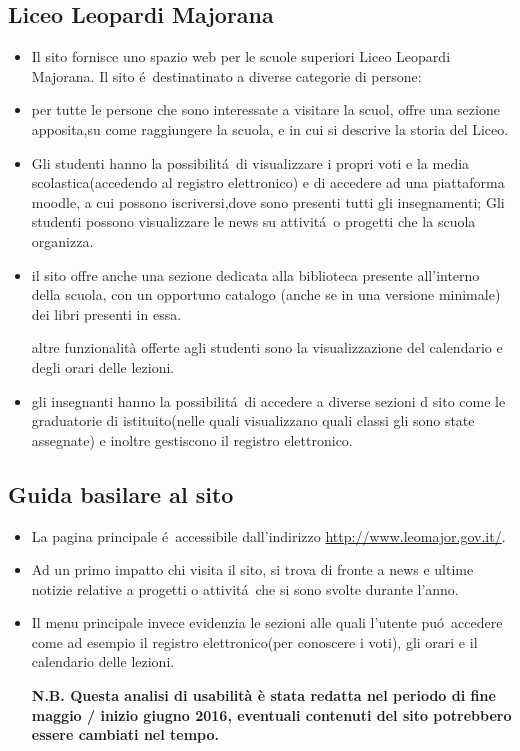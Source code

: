 \documentclass[12pt]{article}
\begin{document}
\subsection{Liceo Leopardi Majorana}
\begin{itemize}
	\item Il sito fornisce uno spazio web per le scuole superiori Liceo Leopardi Majorana. Il sito \'e\ destinatinato a diverse categorie di persone:
	\item per tutte le persone che sono interessate a visitare la scuol, offre una sezione apposita,su come raggiungere la scuola, e in cui si descrive  la storia del Liceo.
	\item Gli studenti hanno la possibilit\'a\ di visualizzare i propri voti e la media scolastica(accedendo al registro elettronico) e di accedere ad una piattaforma moodle, a cui possono iscriversi,dove sono presenti tutti gli insegnamenti; 
	Gli studenti possono  visualizzare le news su attivit\'a\ o progetti che la scuola organizza.

	\item il sito offre anche una sezione dedicata alla biblioteca presente all'interno della scuola, con un opportuno catalogo (anche se in una versione minimale) dei libri presenti in essa. 

	altre funzionalità offerte agli studenti sono la visualizzazione del calendario e degli orari delle lezioni.

	\item gli insegnanti hanno la possibilit\'a\ di accedere a diverse sezioni d sito come le graduatorie di istituito(nelle quali  visualizzano quali classi gli sono state assegnate) e inoltre gestiscono il registro elettronico.
\end{itemize}

\subsection{Guida basilare al sito}
\begin{itemize}

\item La pagina principale \'e\ accessibile dall'indirizzo  \url{http://www.leomajor.gov.it/}.

\item Ad un primo impatto chi visita il sito, si trova di fronte  a news e ultime notizie relative a progetti o attivit\'a\ che si sono svolte durante l'anno. 

\item Il menu principale invece evidenzia le sezioni alle quali l'utente pu\'o\ accedere come ad esempio il registro elettronico(per conoscere i voti), gli orari e il calendario delle lezioni.

\textbf{N.B. Questa analisi di usabilit\`a \`e stata redatta nel periodo di fine maggio / inizio giugno 2016, eventuali contenuti del sito potrebbero essere cambiati nel tempo.}

\end{itemize}
\end{document}
